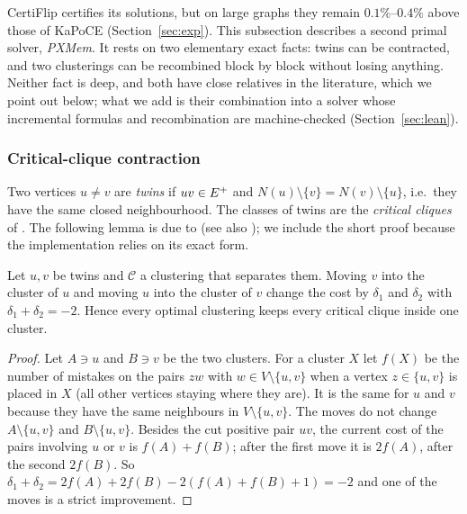 CertiFlip certifies its solutions, but on large graphs they remain
$0.1\%$--$0.4\%$ above those of KaPoCE (Section~\ref{sec:exp}).  This subsection
describes a second primal solver, \emph{PXMem}.  It rests on two elementary
exact facts: twins can be contracted, and two clusterings can be recombined
block by block without losing anything.  Neither fact is deep, and both have
close relatives in the literature, which we point out below; what we add is
their combination into a solver whose incremental formulas and
recombination are machine-checked (Section~\ref{sec:lean}).

\subsubsection{Critical-clique contraction}

Two vertices $u\ne v$ are \emph{twins} if $uv\in E^{+}$ and $N(u)\setminus\{v\}=
N(v)\setminus\{u\}$, i.e.\ they have the same closed neighbourhood.  The classes
of twins are the \emph{critical cliques} of \citet{Guo09kernel}.  The
following lemma is due to \citet{Guo09kernel} (see also
\citet{ProttiDS09modular}); we include the short proof because the
implementation relies on its exact form.

\begin{lemma}\label{lem:twins}
Let $u,v$ be twins and $\mathcal C$ a clustering that separates them.  Moving
$v$ into the cluster of $u$ and moving $u$ into the cluster of $v$ change the
cost by $\delta_1$ and $\delta_2$ with $\delta_1+\delta_2=-2$.  Hence every
optimal clustering keeps every critical clique inside one cluster.
\end{lemma}
\begin{proof}
Let $A\ni u$ and $B\ni v$ be the two clusters.  For a cluster $X$ let
$f(X)$ be the number of mistakes on the pairs $zw$ with $w\in
V\setminus\{u,v\}$ when a vertex $z\in\{u,v\}$ is placed in $X$ (all other
vertices staying where they are).  It is the same for $u$ and $v$ because
they have the same neighbours in $V\setminus\{u,v\}$.  The moves do not change
$A\setminus\{u,v\}$ and $B\setminus\{u,v\}$.  Besides the cut positive pair $uv$,
the current cost of the pairs involving $u$ or $v$ is $f(A)+f(B)$; after the
first move it is $2f(A)$, after the second $2f(B)$.  So $\delta_1+\delta_2=2f(A)+2f(B)
-2(f(A)+f(B)+1)=-2$ and one of the moves is a strict improvement.
\end{proof}

